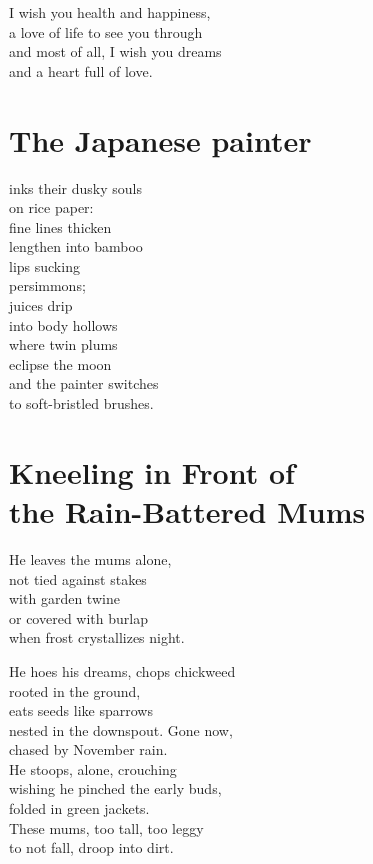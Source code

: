 \documentclass[twoside,10pt]{book}
\begin{document}
I wish you health and happiness,\\
a love of life to see you through\\
and most of all, I wish you dreams\\
and a heart full of love.



\clearpage
\section{The Japanese painter}

inks their dusky souls\\
on rice paper:\\
fine lines thicken\\
lengthen into bamboo\\
lips sucking\\
persimmons;\\
juices drip\\
into body hollows\\
where twin plums\\
eclipse the moon\\
and the painter switches\\
to soft-bristled brushes.


\clearpage
\section{Kneeling in Front of\\ the Rain-Battered Mums}

He leaves the mums alone,\\
not tied against stakes\\
with garden twine\\
or covered with burlap\\
when frost crystallizes night.

He hoes his dreams, chops chickweed\\
rooted in the ground,\\
eats seeds like sparrows\\
nested in the downspout. Gone now,\\
chased by November rain.\\
He stoops, alone, crouching\\
wishing he pinched the early buds,\\
folded in green jackets.\\
These mums, too tall, too leggy\\
to not fall, droop into dirt.
\end{document}
